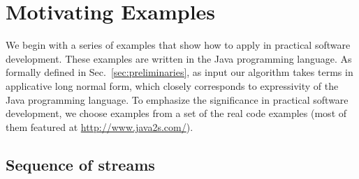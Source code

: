 \section{Motivating Examples}
\label{sec:examples}

We begin with a series of examples that show how to apply \ourTool in practical software
development. These examples are written in the Java programming
language. As formally defined in Sec.~\ref{sec:preliminaries},
as input our algorithm takes terms in applicative long normal
form, which closely corresponds to expressivity of the Java programming language.
To emphasize the significance in practical software development, 
we choose examples from a set of the real code examples (most of them featured at
\url{http://www.java2s.com/}{}).

%
%


\subsection{Sequence of streams}

